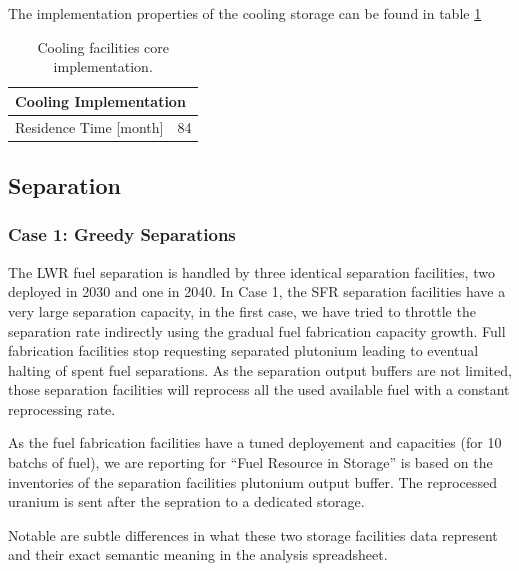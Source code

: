 \documentclass[12pt]{article}
\begin{document}
The implementation properties of the cooling storage can be found in table \ref{tab:cooling_1} 
\begin{table}[h!]
    \centering
    \begin{tabular}{ll}
    \hline
    \multicolumn{2}{l}{Cooling Implementation}  \\
    \hline
    Residence Time [month]   &  84  \\
    \hline
    \end{tabular}
    \caption{Cooling facilities core implementation.}
    \label{tab:cooling_1}
\end{table}

\subsection{Separation}

\subsubsection{Case 1: Greedy Separations}

The LWR fuel separation is handled by three identical separation facilities,
two deployed in 2030 and one in 2040. In Case 1, the SFR separation facilities have a
very large separation capacity, in the first case, we have tried to throttle
the separation rate indirectly using the gradual fuel fabrication capacity
growth. Full fabrication facilities stop requesting separated plutonium
leading to eventual halting of spent fuel separations.  
As the separation output buffers are not limited, those separation facilities will
reprocess all the used available fuel with a constant reprocessing rate.

As the fuel fabrication facilities have a tuned deployement and capacities (for 10
batchs of fuel), we are reporting for ``Fuel Resource in Storage'' is based on the
inventories of the separation facilities plutonium output buffer.
The reprocessed uranium is sent after the sepration to a dedicated storage.

Notable are subtle differences in what these two storage facilities data represent
and their exact semantic meaning in the analysis spreadsheet.
\end{document}
